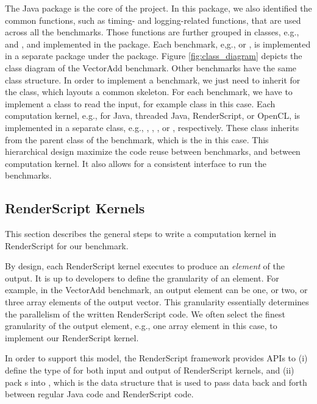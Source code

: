 The  Java package is the core of the project. In this package, we also
identified the common functions, such as timing- and logging-related functions,
that are used across all the benchmarks. Those functions are further grouped in
classes, e.g.,  and , and implemented in the 
package. Each benchmark, e,g.,  or , is implemented in a
separate package under the  package. Figure
\ref{fig:class_diagram} depicts the class diagram of the VectorAdd benchmark.
Other benchmarks have the same class structure. In order to implement a
benchmark, we just need to inherit for the  class, which
layouts a common skeleton. For each benchmark, we have to implement a class to
read the input, for example  class in this case. Each
computation kernel, e.g., for Java, threaded Java, RenderScript, or OpenCL, is
implemented in a separate class, e.g., ,
, , or ,
respectively. These class inherits from the parent class of the benchmark, which
is the  in this case. This hierarchical design maximize
the code reuse between benchmarks, and between computation kernel.
It also allows for a consistent interface to run the benchmarks.

\subsection{RenderScript Kernels}
This section describes the general steps to write a computation kernel in
RenderScript for our benchmark.

By design, each RenderScript kernel executes to produce an \textit{element} of
the output. It is up to developers to define the granularity of an element. For
example, in the VectorAdd benchmark, an output element can be one, or two, or
three array elements of the output vector. This granularity essentially
determines the parallelism of the written RenderScript code. We often select the
finest granularity of the output element, e.g., one array element in this case,
to implement our RenderScript kernel.


In order to support this model, the RenderScript framework provides APIs to (i)
define the type of  for both input and output of RenderScript
kernels, and (ii) pack s into , which is the data
structure that is used to pass data back and forth between regular Java code and
RenderScript code.


